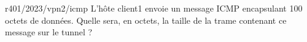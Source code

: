 \begin{question}{r401/2023/vpn2/icmp}
  L'hôte client1 envoie un message ICMP encapsulant 100 octets de
  données. Quelle sera, en octets, la taille de la trame contenant ce
  message sur le tunnel ?
  \begin{reponseshoriz}
  \end{reponseshoriz}
\end{question}
